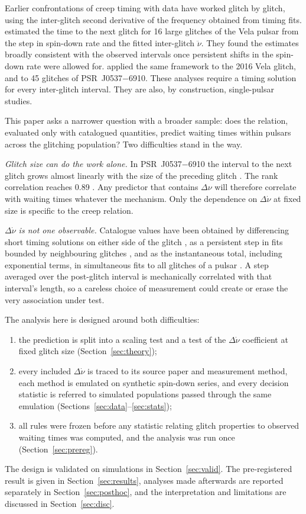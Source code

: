 \documentclass[fleqn,usenatbib]{mnras}
\newcommand{\psr}[1]{PSR~#1}
\begin{document}
Earlier confrontations of creep timing with data have worked glitch by
glitch, using the inter-glitch second derivative of the frequency obtained
from timing fits. \citet{akbal2017} estimated the time to the next glitch
for 16 large glitches of the Vela pulsar from the step in spin-down rate and
the fitted inter-glitch $\ddot\nu$. They found the estimates broadly
consistent with the observed intervals once persistent shifts in the
spin-down rate were allowed for. \citet{gugercinoglu2020} applied the same
framework to the 2016 Vela glitch, and \citet{akbal2021} to 45 glitches of
\psr{J0537$-$6910}. These analyses require a timing solution for every
inter-glitch interval. They are also, by construction, single-pulsar
studies.

This paper asks a narrower question with a broader sample: does the
relation, evaluated only with catalogued quantities, predict waiting times
within pulsars across the glitching population? Two difficulties stand in
the way.

\emph{Glitch size can do the work alone.} In \psr{J0537$-$6910} the interval
to the next glitch grows almost linearly with the size of the preceding
glitch \citep{middleditch2006}. The rank correlation reaches 0.89
\citep{zubieta2026}. Any predictor that contains $\Delta\nu$ will therefore
correlate with waiting times whatever the mechanism. Only the dependence on
$\Delta\dot\nu$ at fixed size is specific to the creep relation.

\emph{$\Delta\dot\nu$ is not one observable.} Catalogue values have been
obtained by differencing short timing solutions on either side of the glitch
\citep{espinoza2011}, as a persistent step in fits bounded by neighbouring
glitches \citep{antonopoulou2018}, and as the instantaneous total, including
exponential terms, in simultaneous fits to all glitches of a pulsar
\citep{basu2022}. A step averaged over the post-glitch interval is
mechanically correlated with that interval's length, so a careless choice of
measurement could create or erase the very association under test.

The analysis here is designed around both difficulties:
\begin{enumerate}
\item the prediction is split into a scaling test and a test of the
$\Delta\dot\nu$ coefficient at fixed glitch size (Section~\ref{sec:theory});
\item every included $\Delta\dot\nu$ is traced to its source paper and
measurement method, each method is emulated on synthetic spin-down series,
and every decision statistic is referred to simulated populations passed
through the same emulation (Sections~\ref{sec:data}--\ref{sec:stats});
\item all rules were frozen before any statistic relating glitch
properties to observed waiting times was computed, and the analysis was run
once (Section~\ref{sec:prereg}).
\end{enumerate}
The design is validated on simulations in Section~\ref{sec:valid}. The
pre-registered result is given in Section~\ref{sec:results}, analyses made
afterwards are reported separately in Section~\ref{sec:posthoc}, and the
interpretation and limitations are discussed in Section~\ref{sec:disc}.
\end{document}
